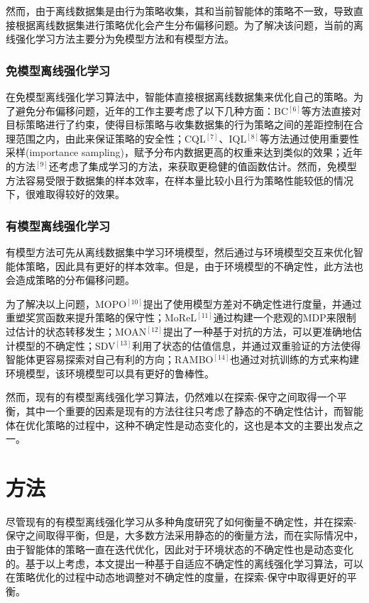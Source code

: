 \documentclass{article}
\begin{document}
然而，由于离线数据集是由行为策略收集，其和当前智能体的策略不一致，导致直接根据离线数据集进行策略优化会产生分布偏移问题。为了解决该问题，当前的离线强化学习方法主要分为免模型方法和有模型方法。

\subsubsection{免模型离线强化学习}
在免模型离线强化学习算法中，智能体直接根据离线数据集来优化自己的策略。为了避免分布偏移问题，近年的工作主要考虑了以下几种方面：BC$^{[6]}$等方法直接对目标策略进行了约束，使得目标策略与收集数据集的行为策略之间的差距控制在合理范围之内，由此来保证策略的安全性；CQL$^{[7]}$、IQL$^{[8]}$等方法通过使用重要性采样(importance sampling)，赋予分布内数据更高的权重来达到类似的效果；近年的方法$^{[9]}$还考虑了集成学习的方法，来获取更稳健的值函数估计。然而，免模型方法容易受限于数据集的样本效率，在样本量比较小且行为策略性能较低的情况下，很难取得较好的效果。

\subsubsection{有模型离线强化学习}
有模型方法可先从离线数据集中学习环境模型，然后通过与环境模型交互来优化智能体策略，因此具有更好的样本效率。但是，由于环境模型的不确定性，此方法也会造成策略的分布偏移问题。

为了解决以上问题，MOPO$^{[10]}$提出了使用模型方差对不确定性进行度量，并通过重塑奖赏函数来提升策略的保守性；MoReL$^{[11]}$通过构建一个悲观的MDP来限制过估计的状态转移发生；MOAN$^{[12]}$提出了一种基于对抗的方法，可以更准确地估计模型的不确定性；SDV$^{[13]}$利用了状态的估值信息，并通过双重验证的方法使得智能体更容易探索对自己有利的方向；RAMBO$^{[14]}$也通过对抗训练的方式来构建环境模型，该环境模型可以具有更好的鲁棒性。

然而，现有的有模型离线强化学习算法，仍然难以在探索-保守之间取得一个平衡，其中一个重要的因素是现有的方法往往只考虑了静态的不确定性估计，而智能体在优化策略的过程中，这种不确定性是动态变化的，这也是本文的主要出发点之一。

\section{方法}
尽管现有的有模型离线强化学习从多种角度研究了如何衡量不确定性，并在探索-保守之间取得平衡，但是，大多数方法采用静态的的衡量方法，而在实际情况中，由于智能体的策略一直在迭代优化，因此对于环境状态的不确定性也是动态变化的。基于以上考虑，本文提出一种基于自适应不确定性的离线强化学习算法，可以在策略优化的过程中动态地调整对不确定性的度量，在探索-保守中取得更好的平衡。
\end{document}
